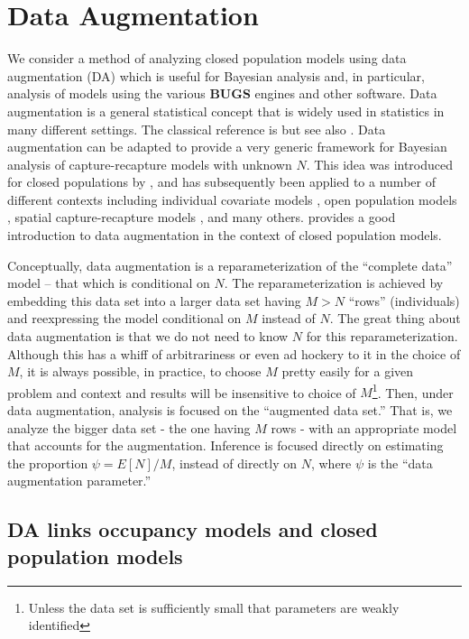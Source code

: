 \section{ Data Augmentation }
\label{closed.sec.da}

We consider a method of analyzing closed population models using data
augmentation (DA) which is useful for Bayesian analysis and, in
particular, analysis of models using the various {\bf BUGS} engines and
other software.  Data augmentation is a general statistical concept
that is widely used in statistics in many different settings. The
classical reference is \citet{tanner_wong:1987} but see also
\citet{liu_wu:1999}.  Data augmentation can be adapted to provide a
very generic framework for Bayesian analysis of capture-recapture
models with unknown $N$. This idea was introduced for closed
populations by \citet{royle_etal:2007}, and has subsequently been
applied to a number of different contexts including individual
covariate models \citep{royle:2009}, open population models
\citep{royle_dorazio:2008,royle_dorazio:2010, gardner_etal:2010ecol},
spatial capture-recapture models \citep{royle_young:2008,
  royle_etal:2010, gardner_etal:2009}, and many
others. \citet[][Chapt. 6]{kery_schaub:2011} provides a good introduction to data
augmentation in the context of closed population models. 


Conceptually, data augmentation is a reparameterization of the
``complete data'' model -- that which is conditional on $N$. The
reparameterization is achieved by embedding this data set into a
larger data set having $M> N$ ``rows'' (individuals) and reexpressing
the model conditional on $M$ instead of $N$. The great thing about 
data augmentation is that we do not need to know $N$ for this reparameterization.
Although this has a whiff of
arbitrariness or even ad hockery to it in the choice of $M$, 
it is always possible, in practice, to choose $M$ pretty easily for
a given problem and context and results will be insensitive to choice
of $M$\footnote{Unless the data set is sufficiently small that parameters are
weakly
identified}.
Then, under data augmentation, analysis
 is focused on the ``augmented data set.'' That is, we analyze the bigger
 data set - the one having $M$ rows - with an appropriate model that
 accounts for the augmentation. Inference is focused directly on
 estimating the proportion $\psi = E[N]/M$, instead of directly on $N$,
 where $\psi$ is the ``data augmentation parameter.''


\subsection{DA links occupancy models and closed population models}

